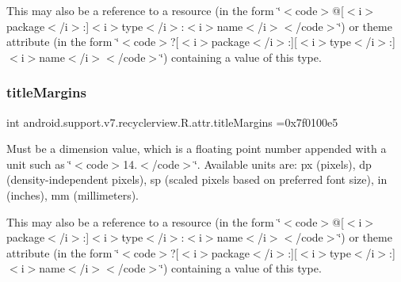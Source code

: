 This may also be a reference to a resource (in the form \char`\"{}$<$code$>$@\mbox{[}$<$i$>$package$<$/i$>$\+:\mbox{]}$<$i$>$type$<$/i$>$\+:$<$i$>$name$<$/i$>$$<$/code$>$\char`\"{}) or theme attribute (in the form \char`\"{}$<$code$>$?\mbox{[}$<$i$>$package$<$/i$>$\+:\mbox{]}\mbox{[}$<$i$>$type$<$/i$>$\+:\mbox{]}$<$i$>$name$<$/i$>$$<$/code$>$\char`\"{}) containing a value of this type. \mbox{\label{classandroid_1_1support_1_1v7_1_1recyclerview_1_1R_1_1attr_ab33f7de0dc6207e5c2ad167b14a97be0}} 
\subsubsection{\texorpdfstring{title\+Margins}{titleMargins}}
{\footnotesize\ttfamily int android.\+support.\+v7.\+recyclerview.\+R.\+attr.\+title\+Margins =0x7f0100e5\hspace{0.3cm}{\ttfamily [static]}}

Must be a dimension value, which is a floating point number appended with a unit such as \char`\"{}$<$code$>$14.\+5sp$<$/code$>$\char`\"{}. Available units are\+: px (pixels), dp (density-\/independent pixels), sp (scaled pixels based on preferred font size), in (inches), mm (millimeters). 

This may also be a reference to a resource (in the form \char`\"{}$<$code$>$@\mbox{[}$<$i$>$package$<$/i$>$\+:\mbox{]}$<$i$>$type$<$/i$>$\+:$<$i$>$name$<$/i$>$$<$/code$>$\char`\"{}) or theme attribute (in the form \char`\"{}$<$code$>$?\mbox{[}$<$i$>$package$<$/i$>$\+:\mbox{]}\mbox{[}$<$i$>$type$<$/i$>$\+:\mbox{]}$<$i$>$name$<$/i$>$$<$/code$>$\char`\"{}) containing a value of this type. \mbox{\label{classandroid_1_1support_1_1v7_1_1recyclerview_1_1R_1_1attr_a42dd963428d4cb0a9158e9d1aa5e7706}} 
